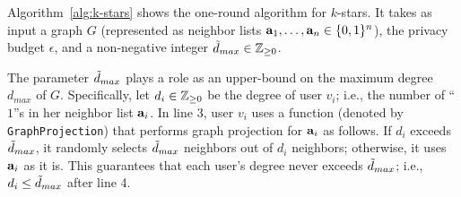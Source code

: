Algorithm~\ref{alg:k-stars} shows the one-round algorithm for $k$-stars. 
It takes as input a graph $G$ (represented as neighbor lists $\mathbf{a}_1, \ldots, \mathbf{a}_n \in \{0,1\}^n$), the privacy budget $\epsilon$, and a non-negative integer $\tilde{d}_{max} \in \mathbb{Z}_{\ge0}$. 

The parameter $\tilde{d}_{max}$ plays a role as an upper-bound on the maximum degree $d_{max}$ of $G$. 
Specifically, let $d_i \in \mathbb{Z}_{\ge0}$ be the degree of user $v_i$; i.e., the number of ``$1$''s in her neighbor list $\mathbf{a}_i$. 
In line 3, user $v_i$
uses a function (denoted by \texttt{GraphProjection}) that performs graph projection \cite{Day_SIGMOD16,Kasiviswanathan_TCC13,Raskhodnikova_arXiv15} for $\mathbf{a}_i$ as follows. 
If $d_i$ exceeds $\tilde{d}_{max}$, it randomly 
selects $\tilde{d}_{max}$ neighbors out of $d_i$ neighbors; otherwise, it uses $\mathbf{a}_i$ as it is. 
This guarantees that each user's degree never exceeds $\tilde{d}_{max}$; i.e., $d_i \leq \tilde{d}_{max}$ after line 4. 


